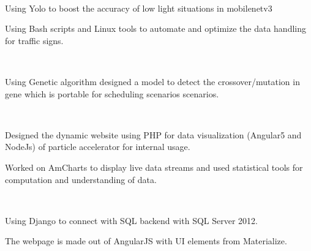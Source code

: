 \documentclass[a4paper]{themagicaltemplate}
\begin{document}
\begin{minipage}[t]{0.66\textwidth} 


 \\
\vspace{\topsep} %
\begin{tightemize}
\item Using Yolo to boost the accuracy of low light situations in mobilenetv3 
\item Using Bash scripts and Linux tools to automate and optimize the data handling for traffic signs.
\end{tightemize}
\sectionsep

 \\
\vspace{\topsep} %
\begin{tightemize}
\item Using Genetic algorithm designed a model to detect the crossover/mutation in gene which is portable for scheduling scenarios scenarios.
\end{tightemize}
\sectionsep

 \\
\vspace{\topsep} %
\begin{tightemize}
\item Designed the dynamic website using PHP for data visualization (Angular5 and NodeJs) of particle accelerator for internal usage.
\item Worked on AmCharts to display live data streams and used statistical tools for computation and understanding of data.
\end{tightemize}
\sectionsep

 \\
\vspace{\topsep} %
\begin{tightemize}
\item Using Django to connect with SQL backend with SQL Server 2012.
\item The webpage is made out of AngularJS with UI elements from Materialize.
\end{tightemize}
\sectionsep


\end{minipage}
\end{document}
